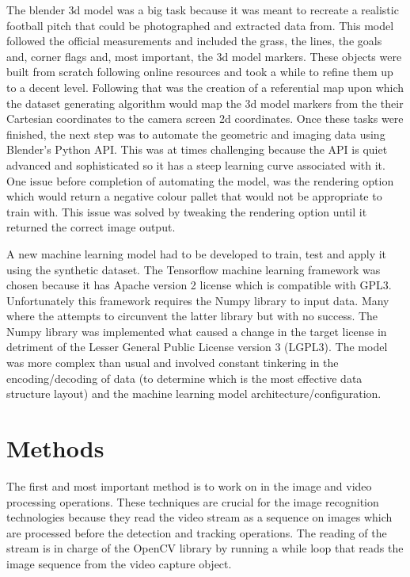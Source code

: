 \documentclass[
11pt,
twoside
]{report}
\begin{document}
The blender 3d model was a big task because it was meant to recreate a realistic football pitch that could be photographed and extracted data from. This model followed the official measurements and included the grass, the lines, the goals and, corner flags and, most important, the 3d model markers. These objects were built from scratch following online resources and took a while to refine them up to a decent level. Following that was the creation of a referential map upon which the dataset generating algorithm would map the 3d model markers from the their Cartesian coordinates to the camera screen 2d coordinates. Once these tasks were finished, the next step was to automate the geometric and imaging data using Blender's Python API. This was at times challenging because the API is quiet advanced and sophisticated so it has a steep learning curve associated with it. One issue before completion of automating the model, was the rendering option which would return a negative colour pallet that would not be appropriate to train with. This issue was solved by tweaking the rendering option until it returned the correct image output.



A new machine learning model had to be developed to train, test and apply it using the synthetic dataset. The Tensorflow machine learning framework was chosen because it has Apache version 2 license which is compatible with GPL3. Unfortunately this framework requires the Numpy \cite{numpy} library to input data. Many where the attempts to circunvent the latter library but with no success. The Numpy \cite{numpy} library was implemented what caused a change in the target license in detriment of the Lesser General Public License version 3 (LGPL3). The model was more complex than usual and involved constant tinkering in the encoding/decoding of data (to determine which is the most effective data structure layout) and the machine learning model architecture/configuration.




\section{Methods}


The first and most important method is to work on in the image and video processing operations. These techniques are crucial for the image recognition technologies because they read the video stream as a sequence on images which are processed before the detection and tracking operations. The reading of the stream is in charge of the OpenCV library by running a while loop that reads the image sequence from the video capture object.
\end{document}
